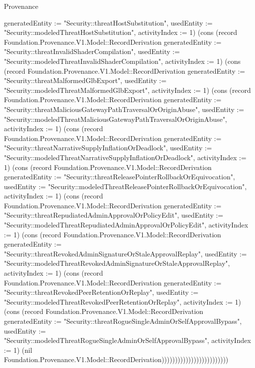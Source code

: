 \begin{lexlean}{Provenance}
\begin{semanticmodule}
{{generatedEntity := "Security::threatHostSubstitution", usedEntity := "Security::modeledThreatHostSubstitution", activityIndex := 1}) (cons (record Foundation.Provenance.V1.Model::RecordDerivation {generatedEntity := "Security::threatInvalidShaderCompilation", usedEntity := "Security::modeledThreatInvalidShaderCompilation", activityIndex := 1}) (cons (record Foundation.Provenance.V1.Model::RecordDerivation {generatedEntity := "Security::threatMalformedGlbExport", usedEntity := "Security::modeledThreatMalformedGlbExport", activityIndex := 1}) (cons (record Foundation.Provenance.V1.Model::RecordDerivation {generatedEntity := "Security::threatMaliciousGatewayPathTraversalOrOriginAbuse", usedEntity := "Security::modeledThreatMaliciousGatewayPathTraversalOrOriginAbuse", activityIndex := 1}) (cons (record Foundation.Provenance.V1.Model::RecordDerivation {generatedEntity := "Security::threatNarrativeSupplyInflationOrDeadlock", usedEntity := "Security::modeledThreatNarrativeSupplyInflationOrDeadlock", activityIndex := 1}) (cons (record Foundation.Provenance.V1.Model::RecordDerivation {generatedEntity := "Security::threatReleasePointerRollbackOrEquivocation", usedEntity := "Security::modeledThreatReleasePointerRollbackOrEquivocation", activityIndex := 1}) (cons (record Foundation.Provenance.V1.Model::RecordDerivation {generatedEntity := "Security::threatRepudiatedAdminApprovalOrPolicyEdit", usedEntity := "Security::modeledThreatRepudiatedAdminApprovalOrPolicyEdit", activityIndex := 1}) (cons (record Foundation.Provenance.V1.Model::RecordDerivation {generatedEntity := "Security::threatRevokedAdminSignatureOrStaleApprovalReplay", usedEntity := "Security::modeledThreatRevokedAdminSignatureOrStaleApprovalReplay", activityIndex := 1}) (cons (record Foundation.Provenance.V1.Model::RecordDerivation {generatedEntity := "Security::threatRevokedPeerRetentionOrReplay", usedEntity := "Security::modeledThreatRevokedPeerRetentionOrReplay", activityIndex := 1}) (cons (record Foundation.Provenance.V1.Model::RecordDerivation {generatedEntity := "Security::threatRogueSingleAdminOrSelfApprovalBypass", usedEntity := "Security::modeledThreatRogueSingleAdminOrSelfApprovalBypass", activityIndex := 1}) (nil Foundation.Provenance.V1.Model::RecordDerivation)))))))))))))))))))))))))
}


\end{semanticmodule}
\end{lexlean}
